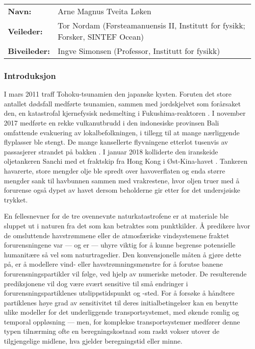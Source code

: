 \begin{tabular}{ll}
    \textbf{Navn:} & Arne Magnus Tveita Løken\\
    \textbf{Veileder:} & Tor Nordam (Førsteamanuensis II, Institutt for fysikk;
    Forsker, SINTEF Ocean)\\
    \textbf{Biveileder:} & Ingve Simonsen (Professor, Institutt for fysikk)\\
\end{tabular}

\subsubsection*{Introduksjon}

I mars 2011 traff Tohoku-tsunamien den japanske kysten. Foruten det store
antallet dødsfall medførte tsunamien, sammen med jordskjelvet som forårsaket
den, en katastrofal kjernefysisk nedsmelting i Fukushima-reaktoren
\parencite{atomic2015fukushima}. I
november 2017 medførte en rekke vulkanutbrudd i den indonesiske provinsen
Bali omfattende evakuering av lokalbefolkningen, i tillegg til at mange
nærliggende flyplasser ble stengt. De mange kansellerte flyvningene etterlot
tusenvis av passasjerer strandet på bakken \parencite{kapoor2017bali}. I januar
2018 kolliderte den iranskeide oljetankeren Sanchi med et fraktskip fra Hong
Kong i Øst-Kina-havet \parencite{obayashi2018stricken}.
Tankeren havarerte, store mengder olje ble spredt over havoverflaten og enda
større mengder sank til havbunnen sammen med vrakrestene, hvor oljen truer
med å forurense også dypet av havet dersom beholderne gir etter for det
undersjøiske trykket.

En fellesnevner for de tre ovennevnte naturkatastrofene er at materiale
ble sluppet ut i naturen fra det som kan betraktes som punktkilder. Å predikere
hvor de omsluttende havstrømmene eller de atmosfæriske vindsystemene fraktet
forurensningene var --- og er --- uhyre viktig for å kunne begrense potensielle
humanitære så vel som naturtragedier. Den konvensjonelle måten å gjøre dette på,
er å modellere vind- eller havstrømningsmønstre for å forutse banene
forurensningspartikler vil følge, ved hjelp av numeriske metoder. De
resulterende prediksjonene vil dog være svært sensitive til små endringer i
forurensningspartiklenes utslippstidspunkt og -sted. For å forsøke å håndtere
partiklenes høye grad av sensitivitet til deres initialbetingelser kan en
benytte ulike modeller for det underliggende transportsystemet, med økende
romlig og temporal oppløsning --- men, for komplekse transportsystemer medfører
denne typen tilnærming ofte en beregningskostnad som raskt vokser utover de
tilgjengelige midlene, hva gjelder beregningstid eller minne.

